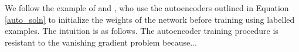 We follow the example of \citep{Bengio:2007uq} and \citep{Vincent:2010fk}, who use the autoencoders outlined in Equation \eqref{auto_soln} to initialize the weights of the network before training using labelled examples. The intuition is as follows. The autoencoder training procedure is resistant to the vanishing gradient problem because...























